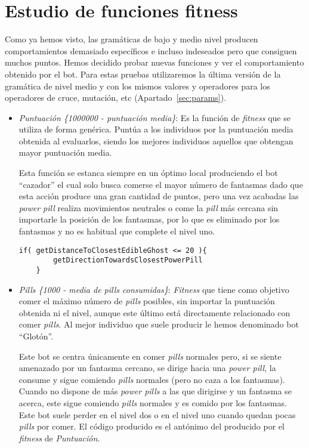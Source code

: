 \section{Estudio de funciones fitness}
Como ya hemos visto, las gramáticas de bajo y medio nivel producen comportamientos demasiado específicos e incluso indeseados pero que consiguen muchos puntos. Hemos decidido probar nuevas funciones y ver el comportamiento obtenido por el bot. Para estas pruebas utilizaremos la última versión de la  gramática de nivel medio y con los mismos valores y operadores para los operadores de cruce, mutación, etc (Apartado~\ref{sec:params}).
\begin{itemize}
\item \textit{Puntuación \{1000000 - puntuación media\}}: Es la función de \textit{fitness} que se utiliza de forma genérica. Puntúa a los individuos por la puntuación media obtenida al evaluarlos, siendo los mejores individuos aquellos que obtengan mayor puntuación media.

Esta función se estanca siempre en un óptimo local produciendo el bot ``cazador'' el cual solo busca comerse el mayor número de fantasmas dado que esta acción produce una gran cantidad de puntos, pero una vez acabadas las \textit{power pill} realiza movimientos neutrales o come la \textit{pill} más cercana sin importarle la posición de los fantasmas, por lo que es eliminado por los fantasmas y no es habitual que complete el nivel uno.

\begin{lstlisting}[frame=single, breaklines=no, basicstyle=\fontsize{10}{11}\ttfamily, caption=Mejor individuo obtenido mediante esta función fitness.]
    if( getDistanceToClosestEdibleGhost <= 20 ){ 
        getDirectionTowardsClosestPowerPill
    }
\end{lstlisting}

\item \textit{Pills \{1000 - media de pills consumidas\}}: \textit{Fitness} que tiene como objetivo comer el máximo número de \textit{pills} posibles, sin importar la puntuación obtenida ni el nivel, aunque este último está directamente relacionado con comer \textit{pills}. Al mejor individuo que suele producir le hemos denominado bot ``Glotón''.

Este bot se centra únicamente en comer \textit{pills} normales pero, si se siente amenazado por un fantasma cercano, se dirige hacia una \textit{power pill}, la consume y sigue comiendo \textit{pills} normales (pero no caza a los fantasmas). Cuando no dispone de más \textit{power pills} a las que dirigirse y un fantasma se acerca, este sigue comiendo \textit{pills} normales y es comido por los fantasmas. Este bot suele perder en el nivel dos o en el nivel uno cuando quedan pocas \textit{pills} por comer. El código producido es el antónimo del producido por el \textit{fitness} de \textit{Puntuación}.


\end{itemize}
